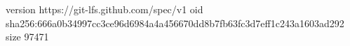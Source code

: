 version https://git-lfs.github.com/spec/v1
oid sha256:666a0b34997cc3ce96d6984a4a456670dd8b7fb63fc3d7eff1c243a1603ad292
size 97471
